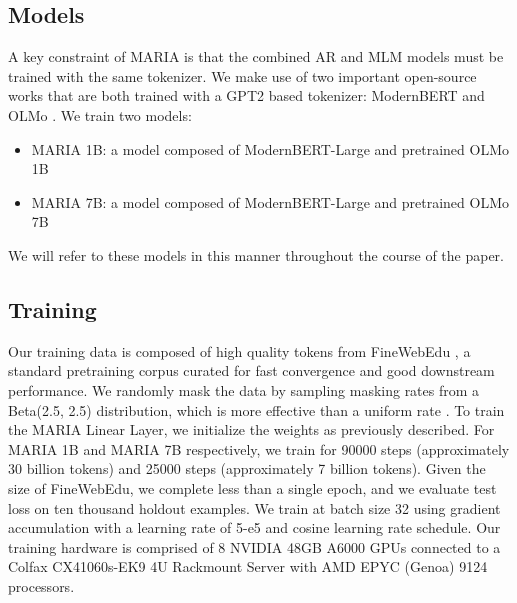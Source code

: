 \subsection*{Models}
A key constraint of MARIA is that the combined AR and MLM models must be trained with the same tokenizer. We make use of two important open-source works that are both trained with a GPT2 \cite{radford2019language} based tokenizer: ModernBERT \cite{warner2024smarter} and OLMo \cite{groeneveld2024olmo}. We train two models: 
\begin{itemize}
    \item MARIA 1B: a model composed of ModernBERT-Large and pretrained OLMo 1B
    \item MARIA 7B: a model composed of ModernBERT-Large and pretrained OLMo 7B
\end{itemize}
We will refer to these models in this manner throughout the course of the paper.



\subsection*{Training}
Our training data is composed of high quality tokens from FineWebEdu \cite{penedo2024finewebdatasetsdecantingweb}, a standard pretraining corpus curated for fast convergence and good downstream performance. We randomly mask the data by sampling masking rates from a Beta(2.5, 2.5) distribution, which is more effective than a uniform rate \cite{shen2023filmfillinlanguagemodels}.
To train the MARIA Linear Layer, we initialize the weights as previously described. For MARIA 1B and MARIA 7B respectively, we train for 90000 steps (approximately 30 billion tokens) and 25000 steps (approximately 7 billion tokens). Given the size of FineWebEdu, we complete less than a single epoch, and we evaluate test loss on ten thousand holdout examples. We train at batch size 32 using gradient accumulation with a learning rate of 5-e5 and cosine learning rate schedule. Our training hardware is comprised of 8 NVIDIA 48GB A6000 GPUs connected to a Colfax CX41060s-EK9 4U Rackmount Server with AMD EPYC (Genoa) 9124 processors.

